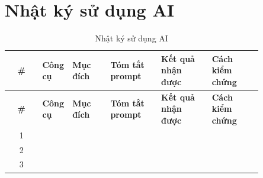 \section{Nhật ký sử dụng AI}
\renewcommand{\arraystretch}{1.3}
\begin{longtable}{c >{\raggedright}p{0.1\linewidth} >{\raggedright}p{0.15\linewidth} >{\raggedright}p{0.2\linewidth} >{\raggedright}p{0.2\linewidth} p{0.2\linewidth}}
\caption{Nhật ký sử dụng AI}\\
\toprule
\textbf{\#} & \textbf{Công cụ} & \textbf{Mục đích} & \textbf{Tóm tắt prompt} & \textbf{Kết quả nhận được} & \textbf{Cách kiểm chứng} \\ \midrule
\endfirsthead
\toprule
\textbf{\#} & \textbf{Công cụ} & \textbf{Mục đích} & \textbf{Tóm tắt prompt} & \textbf{Kết quả nhận được} & \textbf{Cách kiểm chứng} \\ \midrule
\endhead
1 & & & & & \\
2 & & & & & \\
3 & & & & & \\
\bottomrule
\end{longtable}
